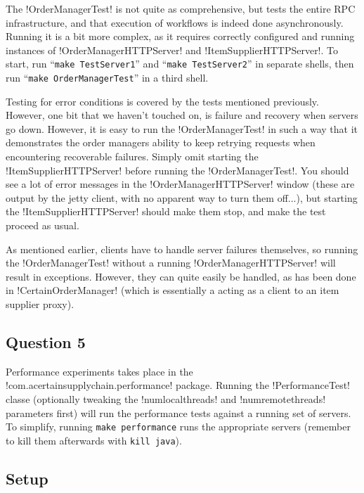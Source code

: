 \documentclass[a4paper, 12pt]{article}
\begin{document}
The !OrderManagerTest! is not quite as comprehensive, but tests the
entire RPC infrastructure, and that execution of workflows is indeed
done asynchronously. Running it is a bit more complex, as it requires
correctly configured and running instances of !OrderManagerHTTPServer!
and !ItemSupplierHTTPServer!. To start, run ``\texttt{make
  TestServer1}'' and ``\texttt{make TestServer2}'' in separate shells,
then run ``\texttt{make OrderManagerTest}'' in a third shell.

Testing for error conditions is covered by the tests mentioned
previously. However, one bit that we haven't touched on, is failure
and recovery when servers go down. However, it is easy to run the
!OrderManagerTest! in such a way that it demonstrates the order
managers ability to keep retrying requests when encountering
recoverable failures. Simply omit starting the
!ItemSupplierHTTPServer! before running the !OrderManagerTest!. You
should see a lot of error messages in the !OrderManagerHTTPServer!
window (these are output by the jetty client, with no apparent way to
turn them off...), but starting the !ItemSupplierHTTPServer! should
make them stop, and make the test proceed as usual.

As mentioned earlier, clients have to handle server failures
themselves, so running the !OrderManagerTest! without a running
!OrderManagerHTTPServer! will result in exceptions. However, they can
quite easily be handled, as has been done in !CertainOrderManager!
(which is essentially a acting as a client to an item supplier proxy).


\subsection*{Question 5}


Performance experiments takes place in the
!com.acertainsupplychain.performance! package. Running the
!PerformanceTest! classe (optionally tweaking the !numlocalthreads!
and !numremotethreads! parameters first) will run the performance
tests against a running set of servers. To simplify, running
\texttt{make performance} runs the appropriate servers (remember to
kill them afterwards with \texttt{kill java}).

\subsection*{Setup}
\end{document}
